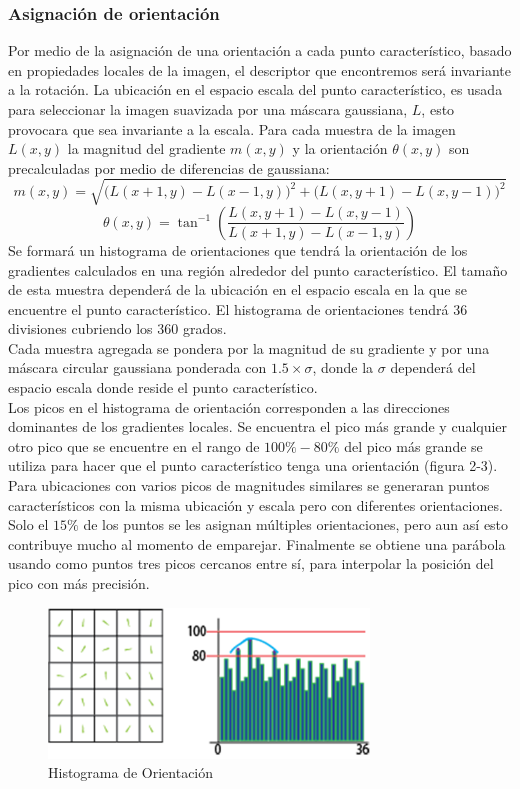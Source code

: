 \subsubsection{Asignación de orientación}
Por medio de la asignación de una orientación a cada punto característico, basado en propiedades locales de la imagen, el descriptor que encontremos será invariante a la rotación. La ubicación en el espacio escala del punto característico, es usada para seleccionar la imagen suavizada por una máscara gaussiana, $L$, esto provocara que sea invariante a la escala. Para cada muestra de la imagen $L(x,y)$ la magnitud del gradiente $m(x,y)$ y la orientación $\theta(x,y)$ son precalculadas por medio de diferencias de gaussiana:
$$m(x,y) = \sqrt{ \big(L(x+1,y)-L(x-1,y)\big)^2 + \big(L(x,y+1)-L(x,y-1)\big)^2 }$$		
$$\theta(x,y) =  \tan^{-1} \left(\frac{L(x,y+1)-L(x,y-1)}{L(x+1,y)-L(x-1,y)}\right)$$
Se formará un histograma de orientaciones que tendrá la orientación de los gradientes calculados en una región alrededor del punto característico. El tamaño de esta muestra dependerá de la ubicación en el espacio escala en la que se encuentre el punto característico. El histograma de orientaciones tendrá 36 divisiones cubriendo los 360 grados.\\
Cada muestra agregada se pondera por la magnitud de su gradiente y por una máscara circular gaussiana ponderada con $1.5\times\sigma$, donde la  $\sigma$ dependerá del espacio escala donde reside el punto característico.\\	
Los picos en el histograma de orientación corresponden a las direcciones dominantes de los gradientes locales. Se encuentra el pico más grande y cualquier otro pico que se encuentre en el rango de $100\% - 80\%$ del pico más grande se utiliza para hacer que el punto característico tenga una orientación (figura 2-3). Para ubicaciones con varios picos de magnitudes similares se generaran puntos característicos con la misma ubicación y escala pero con diferentes orientaciones. Solo el $15\%$ de los puntos se les asignan múltiples orientaciones, pero aun así esto contribuye mucho al momento de emparejar. Finalmente se obtiene una parábola usando como puntos tres picos cercanos entre sí, para interpolar la posición del pico con más precisión.
\begin{figure}[H]
	\centering
		\includegraphics[height=4cm]{img/HistoOrientacion.png}
	\caption{Histograma de Orientación}
\end{figure}
